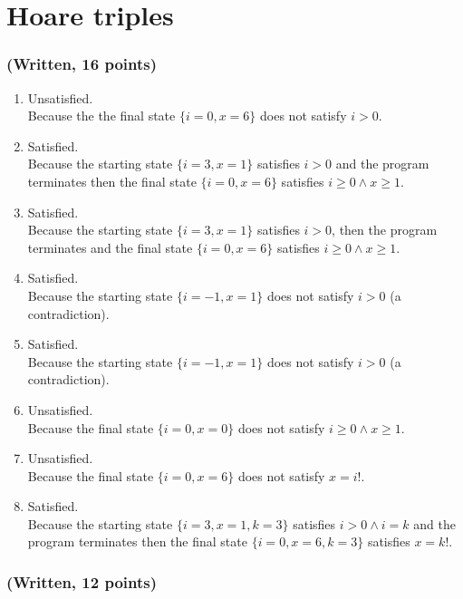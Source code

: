 \documentclass{article}
\begin{document}
\section{Hoare triples}

\subsubsection{(Written, 16 points)}

\begin{enumerate}
    \item Unsatisfied.\\
        Because the the final state $\{i = 0, x = 6\}$ does not satisfy $i > 0$.
    \item Satisfied.\\
        Because the starting state $\{i = 3, x = 1\}$ satisfies $i > 0$ and the
        program terminates then the final state $\{i = 0, x = 6\}$ satisfies
        $i \geq 0 \wedge x \geq 1$.
    \item Satisfied.\\
        Because the starting state $\{i = 3, x = 1\}$ satisfies $i > 0$, then the
        program terminates and the final state $\{i = 0, x = 6\}$ satisfies
        $i \geq 0 \wedge x \geq 1$.
    \item Satisfied.\\
        Because the starting state $\{i = -1, x = 1\}$ does not satisfy $i > 0$
        (a contradiction).
    \item Satisfied.\\
        Because the starting state $\{i = -1, x = 1\}$ does not satisfy $i > 0$
        (a contradiction).
    \item Unsatisfied.\\
        Because the final state $\{i = 0, x = 0\}$ does not satisfy
        $i \geq 0 \wedge x \geq 1$.
    \item Unsatisfied.\\
        Because the final state $\{i = 0, x = 6\}$ does not satisfy $x = i!$.
    \item Satisfied.\\
        Because the starting state $\{i = 3, x = 1, k = 3\}$ satisfies $i > 0 \wedge
        i = k$ and the program terminates then the final state $\{i = 0, x = 6, k = 3\}$
        satisfies $x = k!$.
\end{enumerate}

\subsubsection{(Written, 12 points)}
\end{document}
